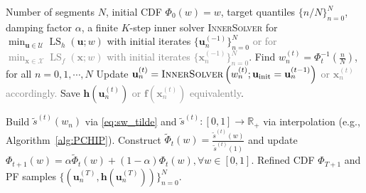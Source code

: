 \documentclass{article}
\newcommand{\bx}{\mathbf{x}}
\newcommand{\bu}{\mathbf{u}}
\newcommand{\X}{\mathcal{X}}
\newcommand{\U}{\mathcal{U}}
\newcommand{\LS}{\operatorname{LS}}
\newcommand{\h}{\mathbf{h}}
\newcommand{\Farc}{\Phi}
\begin{document}
\begin{algorithm}[t]
\caption{SURF: \textbf{S}ampling \textbf{U}niformly along the Pa\textbf{r}eto \textbf{F}ront%
}
\label{alg:SURF}
\begin{algorithmic}[1]
\Require Number of segments $N$, initial CDF $\Farc_0(w)=w$, target quantiles $\{n/N\}_{n=0}^N$, damping factor $\alpha$,
a finite $K$-step inner solver \textsc{InnerSolver} for $\min_{\bu\in \U} \LS_h(\bu;w)$ with initial iterates $\{\bu_n^{(-1)}\}_{n=0}^N$
\textcolor{gray}{or for $\min_{\bx\in \X} \LS_f(\bx;w)$ with initial iterates $\{\bx_n^{(-1)}\}_{n=0}^N$}.
 \State Find $w_n^{(t)} = \Farc_t^{-1}(\frac{n}{N})$, for all $n=0,1,\cdots,N$ \label{algline: outerloop begin}
  \label{algline: innerloop begin}
 \State Update $\bu_n^{(t)} = \textsc{InnerSolver}\left(w_n^{(t)}; \bu_{\text{init}}=\bu_n^{(t-1)}\right)$ \textcolor{gray}{ or $\bx_n^{(t)}$ accordingly.}
 \State Save $\mathbf{h}(\bu_n^{(t)})$ \textcolor{gray}{ or $\mathbf{f}(\bx_n^{(t)})$ equivalently}. 
 \EndFor \label{algline: innerloop end}

 \State Build $\tilde{s}^{(t)}(w_n)$ via \eqref{eq:sw_tilde}
 and $\tilde s^{(t)}:[0,1]\rightarrow \mathbb{R}_+$ via interpolation (e.g., Algorithm~\ref{alg:PCHIP}). 
 \State Construct $\tilde \Farc_{t}(w)=\frac{\tilde s^{(t)}(w)}{\tilde s^{(t)}(1)}$ and update $\Farc_{t+1}(w) = \alpha \tilde{\Farc}_{t}(w) + (1-\alpha)\Farc_t(w),\forall w\in [0,1]$.
 \label{algline: outerloop end}
\EndFor
\Ensure Refined CDF $\Farc_{T+1}$ and PF samples $\{(\bu_n^{(T)},\h(\bu_n^{(T)}))\}_{n=0}^N$.
\end{algorithmic}
\end{algorithm}
\end{document}
